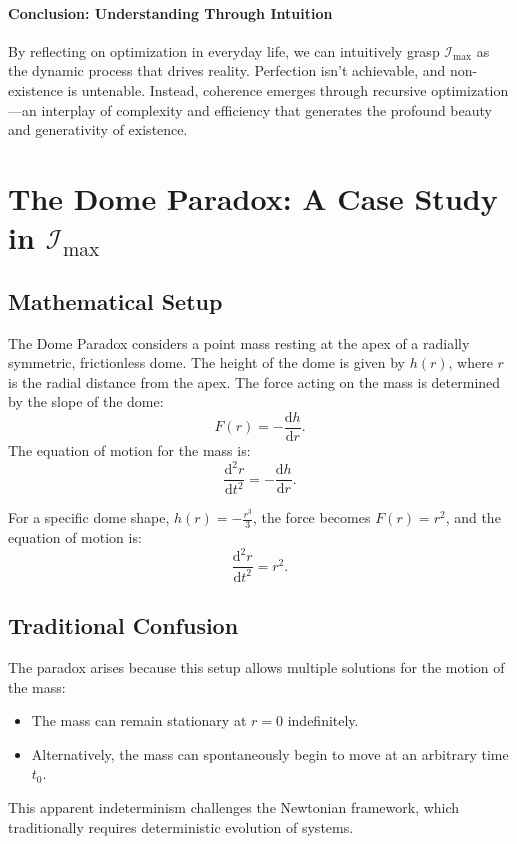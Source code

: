 \documentclass[12pt]{article}
\begin{document}
\paragraph{Conclusion: Understanding Through Intuition}
By reflecting on optimization in everyday life, we can intuitively grasp \( \mathcal{I}_{\text{max}} \) as the dynamic process that drives reality. Perfection isn’t achievable, and non-existence is untenable. Instead, coherence emerges through recursive optimization—an interplay of complexity and efficiency that generates the profound beauty and generativity of existence.


\section{The Dome Paradox: A Case Study in $\mathcal{I}_{\text{max}}$}

\subsection{Mathematical Setup}
The Dome Paradox considers a point mass resting at the apex of a radially symmetric, frictionless dome. The height of the dome is given by $h(r)$, where $r$ is the radial distance from the apex. The force acting on the mass is determined by the slope of the dome:
\begin{equation}
    F(r) = - \frac{\mathrm{d} h}{\mathrm{d} r}.
\end{equation}
The equation of motion for the mass is:
\begin{equation}
    \frac{\mathrm{d}^2 r}{\mathrm{d} t^2} = - \frac{\mathrm{d} h}{\mathrm{d} r}.
\end{equation}

For a specific dome shape, $h(r) = -\frac{r^3}{3}$, the force becomes $F(r) = r^2$, and the equation of motion is:
\begin{equation}
    \frac{\mathrm{d}^2 r}{\mathrm{d} t^2} = r^2.
\end{equation}

\subsection{Traditional Confusion}
The paradox arises because this setup allows multiple solutions for the motion of the mass:
\begin{itemize}
    \item The mass can remain stationary at $r = 0$ indefinitely.
    \item Alternatively, the mass can spontaneously begin to move at an arbitrary time $t_0$.
\end{itemize}
This apparent indeterminism challenges the Newtonian framework, which traditionally requires deterministic evolution of systems.
\end{document}
